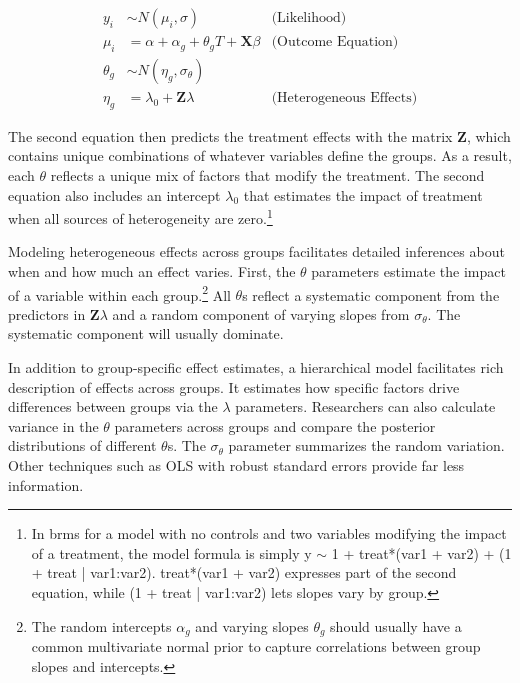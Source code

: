 \documentclass[12pt]{article}
\begin{document}
\begin{equation}
\begin{aligned}
y_i &\sim N(\mu_i, \sigma) &\text{(Likelihood)} \\
\mu_i &= \alpha + \alpha_g + \theta_g \textit{T} + \textbf{X} \beta &\text{(Outcome Equation)}  \\
\theta_g &\sim N(\eta_g, \sigma_\theta) \\ 
\eta_g &= \lambda_0 + \textbf{Z} \lambda &\text{(Heterogeneous Effects)} 
\end{aligned}
\end{equation}


The second equation then predicts the treatment effects with the matrix \textbf{Z}, which contains unique combinations of whatever variables define the groups.  
As a result, each $\theta$ reflects a unique mix of factors that modify the treatment.
The second equation also includes an intercept $\lambda_0$ that estimates the impact of treatment when all sources of heterogeneity are zero.\footnote{In brms for a model with no controls and two variables modifying the impact of a treatment, the model formula is simply y $\sim$ 1 + treat*(var1 + var2) + (1 + treat | var1:var2). treat*(var1 + var2) expresses part of the second equation, while (1 + treat | var1:var2) lets slopes vary by group.}


Modeling heterogeneous effects across groups facilitates detailed inferences about when and how much an effect varies.
First, the $\theta$ parameters estimate the impact of a variable within each group.\footnote{The random intercepts $\alpha_g$ and varying slopes $\theta_g$ should usually have a common multivariate normal prior to capture correlations between group slopes and intercepts.}
All $\theta$s reflect a systematic component from the predictors in \textbf{Z}$\lambda$ and a random component of varying slopes from $\sigma_\theta$. 
The systematic component will usually dominate. 


In addition to group-specific effect estimates, a hierarchical model facilitates rich description of effects across groups. 
It estimates how specific factors drive differences between groups via the $\lambda$ parameters.
Researchers can also calculate variance in the $\theta$ parameters across groups and compare the posterior distributions of different $\theta$s. 
The $\sigma_\theta$ parameter summarizes the random variation. 
Other techniques such as OLS with robust standard errors provide far less information.
\end{document}
